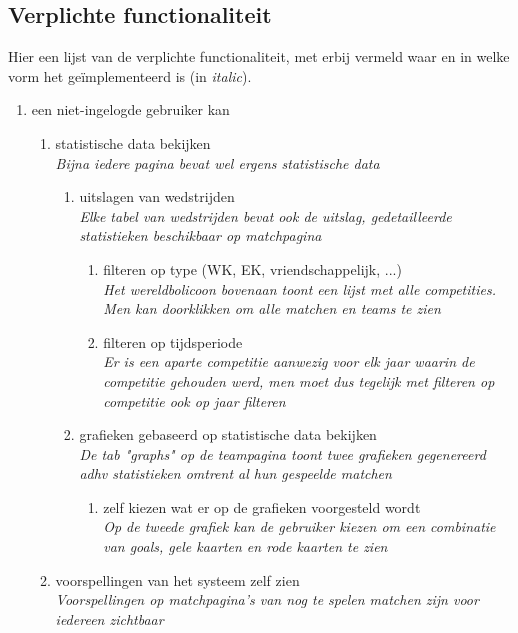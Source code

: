 \documentclass[11pt, a4paper]{article}
\begin{document}
\subsection{Verplichte functionaliteit}
Hier een lijst van de verplichte functionaliteit, met erbij vermeld waar en in welke vorm het ge\"implementeerd is (in \textit{italic}).
\begin{enumerate}
\item een niet-ingelogde gebruiker kan
\begin{enumerate}
\item statistische data bekijken\\
\textit{Bijna iedere pagina bevat wel ergens statistische data}
\begin{enumerate}
\item uitslagen van wedstrijden \\
\textit{Elke tabel van wedstrijden bevat ook de uitslag, gedetailleerde statistieken beschikbaar op matchpagina}
\begin{enumerate}
\item filteren op type (WK, EK, vriendschappelijk, ...) \\
\textit{Het wereldbolicoon bovenaan toont een lijst met alle competities. Men kan doorklikken om alle matchen en teams te zien}
\item filteren op tijdsperiode \\
\textit{Er is een aparte competitie aanwezig voor elk jaar waarin de competitie gehouden werd, men moet dus tegelijk met filteren op competitie ook op jaar filteren}
\end{enumerate}
\item grafieken gebaseerd op statistische data bekijken \\
\textit{De tab "graphs" op de teampagina toont twee grafieken gegenereerd adhv statistieken omtrent al hun gespeelde matchen}
\begin{enumerate}
\item zelf kiezen wat er op de grafieken voorgesteld wordt \\
\textit{Op de tweede grafiek kan de gebruiker kiezen om een combinatie van goals, gele kaarten en rode kaarten te zien}
\end{enumerate}
\end{enumerate}
\item voorspellingen van het systeem zelf zien \\
\textit{Voorspellingen op matchpagina's van nog te spelen matchen zijn voor iedereen zichtbaar}
\end{enumerate}


\end{enumerate}
\end{document}
